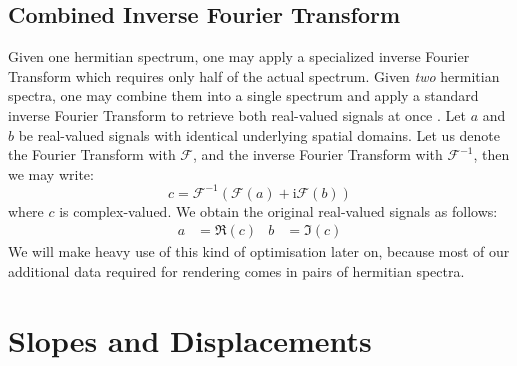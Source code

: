 \subsection{Combined Inverse Fourier Transform}
Given one hermitian spectrum, one may apply a specialized inverse Fourier Transform
which requires only half of the actual spectrum. Given \emph{two} hermitian spectra,
one may combine them into a single spectrum and apply a standard inverse Fourier Transform
to retrieve both real-valued signals at once \citep{fft:handbook}.
Let $a$ and $b$ be real-valued signals with identical underlying spatial domains.
Let us denote the Fourier Transform with $\mathcal{F}$, and the inverse Fourier
Transform with $\mathcal{F}^{-1}$, then we may write:
\begin{equation}
c = \mathcal{F}^{-1}(\mathcal{F}(a)+\mathrm{i}\mathcal{F}(b))
\end{equation}
where $c$ is complex-valued. We obtain the original real-valued signals as follows:
\begin{align*}
a &= \Re(c) & b &= \Im(c)
\end{align*}
%
We will make heavy use of this kind of optimisation later on, because most
of our additional data required for rendering comes in pairs of hermitian spectra.
%
\section{Slopes and Displacements}
\label{sec:slopes_and_displacements}
